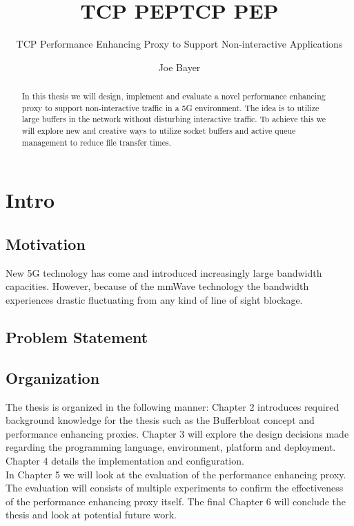 \documentclass[a4paper,english, 11pt]{report}
\author{Joe Bayer}
\title{TCP PEP}
\subtitle{TCP Performance Enhancing Proxy to Support Non-interactive Applications}
\title{TCP PEP}
\begin{document}
\uiomasterfp[program={Informatics: Programming and System Architecture}, supervisors={Michael Welzl\and Kristjon Ciko}]
\tableofcontents


\listoffigures
{}

\begin{abstract}
In this thesis we will design, implement and evaluate a novel performance enhancing proxy to support non-interactive traffic in a 5G environment. The idea is to utilize large buffers in the network without disturbing interactive traffic. To achieve this we will explore new and creative ways to utilize socket buffers and active queue management to reduce file transfer times.
\end{abstract}

\chapter{Intro}

\section{Motivation}
New 5G technology has come and introduced increasingly large bandwidth capacities. However, because of the mmWave technology the bandwidth experiences drastic fluctuating from any kind of line of sight blockage.

\section{Problem Statement}

\section{Organization}
The thesis is organized in the following manner: Chapter 2 introduces required background knowledge for the thesis such as the Bufferbloat concept and performance enhancing proxies. Chapter 3 will explore the design decisions made regarding the programming language, environment, platform and deployment. Chapter 4 details the implementation and configuration.\\

In Chapter 5 we will look at the evaluation of the performance enhancing proxy. The evaluation will consists of multiple experiments to confirm the effectiveness of the performance enhancing proxy itself. The final Chapter 6 will conclude the thesis and look at potential future work.
\end{document}
